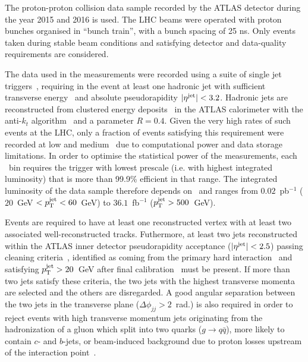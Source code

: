 The proton-proton collision data sample recorded by the ATLAS detector during the year 2015 and 2016 is used. The LHC beams were operated with proton bunches organised in ``bunch train'', with a bunch spacing of 25 ns. Only events taken during stable beam conditions and satisfying detector and data-quality requirements are considered. 

The data used in the measurements were recorded using a suite of single jet triggers~\cite{TRIG-2016-01}, requiring in the event at least one hadronic jet with sufficient transverse energy \ptjet\ and absolute pseudorapidity $|\eta^{\textrm{jet}}|<3.2$. Hadronic jets are reconstructed from clustered energy deposits~\cite{PERF-2014-07} in the ATLAS calorimeter with the anti-$k_t$ algorithm~\cite{anti_kt} and a parameter $R=0.4$. Given the very high rates of such events at the LHC, only a fraction of events satisfying this requirement were recorded at low and medium \ptjet\ due to computational power and data storage limitations. In order to optimise the statistical power of the measurements, each \ptjet\ bin requires the trigger with lowest prescale (i.e. with highest integrated luminosity) that is more than 99.9\% efficient in that range. The integrated luminosity of the data sample therefore depends on \ptjet\ and ranges from $0.02$~pb$^{-1}$ ($20$~GeV $<p_{\mathrm{T}}^{\textrm{jet}}<60$~GeV) to $36.1$~fb$^{-1}$ ($p_{\mathrm{T}}^{\textrm{jet}}>500$~GeV).

Events are required to have at least one reconstructed vertex with at least two associated well-reconstructed tracks. Futhermore, at least two jets reconstructed within the ATLAS inner detector pseudorapidity acceptance ($|\eta^{\textrm{jet}}|<2.5$) passing cleaning criteria~\cite{ATLAS-CONF-2015-029}, identified as coming from the primary hard interaction~\cite{ATLAS-CONF-2014-018} and satisfying $p_{\mathrm{T}}^{\textrm{jet}}>20$~GeV after final calibration~\cite{PERF-2016-04} must be present. If more than two jets satisfy these criteria, the two jets with the highest transverse momenta are selected and the others are disregarded. A good angular separation between the two jets in the transverse plane ($\Delta\phi_{jj}>2$~rad.) is also required in order to reject events with high transverse momentum jets originating from the hadronization of a gluon which split into two quarks ($g\rightarrow q\bar{q}$), more likely to contain $c$- and $b$-jets, or beam-induced background due to proton losses upstream of the interaction point~\cite{DAPR-2012-01}. 

